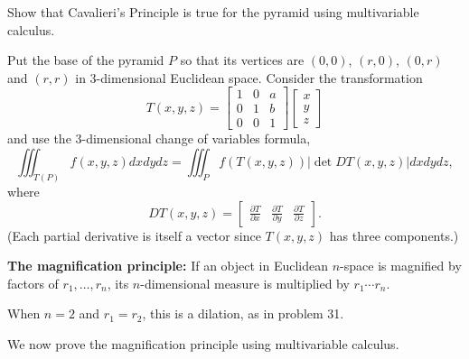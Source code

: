 \documentclass[newpage,hints,handout]{ximera}
\begin{document}
\begin{problem}
Show that Cavalieri's Principle is true for the pyramid using
multivariable calculus.

\begin{hint}
Put the base of the pyramid $P$ so that its vertices are $\left(
0,0\right) $, $\left( r,0\right) $, $\left( 0,r\right) $ and $\left(
r,r\right) $ in $3$-dimensional Euclidean space. Consider the
transformation%
\[
T(x,y,z)=
\begin{bmatrix}
1 & 0 & a\\
0 & 1 & b\\
0 & 0 & 1
\end{bmatrix}
\begin{bmatrix} x \\ y \\ z\end{bmatrix}
\]
and use the 3-dimensional change of variables formula,
$$\iiint_{T(P)} f(x,y,z)dxdydz=\iiint_P f(T(x,y,z))\lvert\det DT(x,y,z)\rvert dxdydz,$$
where
$$DT(x,y,z)=\begin{bmatrix}
\frac{\partial T}{\partial x} & \frac{\partial T}{\partial y} & \frac{\partial T}{\partial z}
\end{bmatrix}.$$
(Each partial derivative is itself a vector since $T(x,y,z)$ has three
components.)
\end{hint}



\end{problem}


\textbf{The magnification principle:} If an object in Euclidean $n$-space is
magnified by factors of $r_{1},\ldots,r_{n}$, its $n$-dimensional
measure is multiplied by $r_{1}\cdots r_{n}$.
\begin{remark}
 When $n=2$ and $r_1=r_2$, this is a dilation, as in problem 31.
\end{remark}

\begin{theorem}
We now prove the magnification principle using multivariable calculus.
\end{theorem}
\end{document}
